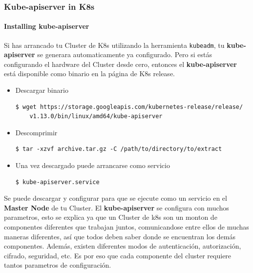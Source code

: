 \documentclass{article}
\newenvironment{codetemplate}[1][]{%
  \mybasecolorbox[#1]
  \itshape
}{%
  \endmybasecolorbox
}
\begin{document}
\subsubsection{Kube-apiserver in K8s}

\paragraph{Installing kube-apiserver}

Si has arrancado tu Cluster de K8s utilizando la herramienta \verb|kubeadm|, tu \textbf{kube-apiserver} se generara automaticamente ya configurado. Pero si estás configurando el hardware del Cluster desde cero, entonces el \textbf{kube-apiserver} está disponible como binario en la página de K8s release.

\begin{itemize}
    \item Descargar binario
\begin{codetemplate}{}
\begin{verbatim}
$ wget https://storage.googleapis.com/kubernetes-release/release/
    v1.13.0/bin/linux/amd64/kube-apiserver
\end{verbatim}
\end{codetemplate}

    \item Descomprimir
\begin{codetemplate}{}
\begin{verbatim}
$ tar -xzvf archive.tar.gz -C /path/to/directory/to/extract
\end{verbatim}
\end{codetemplate} 

    \item Una vez descargado puede arrancarse como servicio
\begin{codetemplate}{}
\begin{verbatim}
$ kube-apiserver.service
\end{verbatim}
\end{codetemplate}
\end{itemize}

Se puede descargar y configurar para que se ejecute como un servicio en el \textbf{Master Node} de tu Cluster. El \textbf{kube-apiserver} se configura con muchos parametros, esto se explica ya que un Cluster de k8s son un monton de componentes diferentes que trabajan juntos, comunicandose entre ellos de muchas maneras diferentes, así que todos deben saber donde se encuentran los demás componentes. Además, existen diferentes modos de autenticación, autorización, cifrado, seguridad, etc. Es por eso que cada componente del cluster requiere tantos parametros de configuración.
\end{document}

